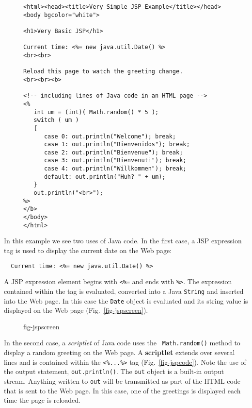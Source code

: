 \begin{figure}[h!]
\jjjprogstart
\begin{jjjlisting}
\begin{lstlisting}
<html><head><title>Very Simple JSP Example</title></head>
<body bgcolor="white">

<h1>Very Basic JSP</h1>

Current time: <%= new java.util.Date() %>
<br><br>

Reload this page to watch the greeting change.
<br><br><b>

<!-- including lines of Java code in an HTML page -->
<%
   int um = (int)( Math.random() * 5 );
   switch ( um )
   {
      case 0: out.println("Welcome"); break;
      case 1: out.println("Bienvenidos"); break;
      case 2: out.println("Bienvenue"); break;
      case 3: out.println("Bienvenuti"); break;
      case 4: out.println("Willkommen"); break;
      default: out.println("Huh? " + um);
   }
   out.println("<br>");
%>
</b>
</body>
</html>
\end{lstlisting}
\end{jjjlisting}
\end{figure}


In this example we see two uses of Java
code.  In the first case, a JSP expression tag is used to display the
current date on the Web page:

\begin{jjjlisting}
\begin{lstlisting}
  Current time: <%= new java.util.Date() %>
\end{lstlisting}
\end{jjjlisting}

\noindent A JSP expression element begins with {\tt <\%=} and ends
with {\tt \%>}.  The expression contained within the tag is
evaluated, converted into a Java {\tt String} and inserted into the
Web page.  In this case the {\tt Date} object is evaluated and its
string value is displayed on the Web page (Fig.~\ref{fig-jspscreen}).

\begin{figure}[tb]
 {fig-jspscreen}
\end{figure}

In the second case, a {\em scriptlet} of Java code uses the {\tt
Math.random()} method to display a random greeting on the Web page.  A
{\bf scriptlet} extends over several lines and is contained within the
{\tt <\%...\%>} tag (Fig.~\ref{fig-jspcode}).  Note the use of the
output statement, {\tt out.println()}. The {\tt out} object is a
built-in output stream.  Anything written to {\tt out} will be
transmitted as part of the HTML code that is sent to the Web page. In
this case, one of the greetings is displayed each time the page is
reloaded.

